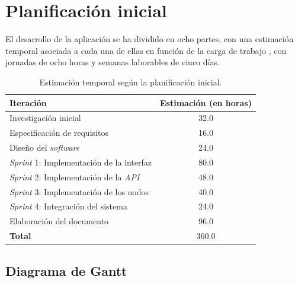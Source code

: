 
\section{Planificación inicial} \label{sec:initialplan}

El desarrollo de la aplicación se ha dividido en ocho partes, con una estimación temporal asociada a cada una de ellas en función de la carga de trabajo , con jornadas de ocho horas y semanas laborables de cinco días.\sn

\begin{table}[ht]
    \begin{center}
        \begin{tabular}{| l | c |}
            \hline
            \textbf{Iteración} & \textbf{Estimación} (en horas) \\
            \hline
            Investigación inicial                   & 32.0   \\ \hline
            Especificación de requisitos            & 16.0   \\ \hline
            Diseño del \textit{software}            & 24.0   \\ \hline
            \textit{Sprint} 1: Implementación de la interfaz & 80.0  \\ \hline
            \textit{Sprint} 2: Implementación de la \textit{API}      & 48.0   \\ \hline
            \textit{Sprint} 3: Implementación de los nodos   & 40.0   \\ \hline
            \textit{Sprint} 4: Integración del sistema       & 24.0   \\ \hline
            Elaboración del documento               & 96.0  \\ \hline
            \textbf{Total}                          & 360.0 \\ \hline
        \end{tabular}
    \end{center}
    \caption{Estimación temporal según la planificación inicial.}
    \label{tab:initialplan}
\end{table}
\vspace{1cm}

\subsection{Diagrama de Gantt} \label{sub:gantt}


